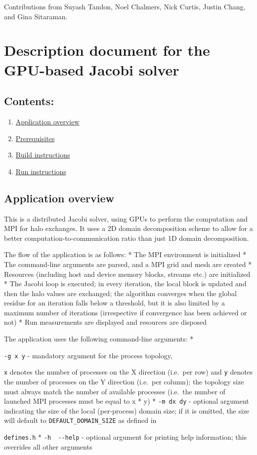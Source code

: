 \documentclass[
]{article}
\let\oldtexttt\texttt
\renewcommand{\texttt}[1]{
  \colorbox{Light}{\oldtexttt{#1}}
}
\begin{document}
Contributions from Suyash Tandon, Noel Chalmers, Nick Curtis, Justin
Chang, and Gina Sitaraman.

\hypertarget{description-document-for-the-gpu-based-jacobi-solver}{%
\section{Description document for the GPU-based Jacobi
solver}\label{description-document-for-the-gpu-based-jacobi-solver}}

\hypertarget{contents}{%
\subsection{Contents:}\label{contents}}

\begin{enumerate}
\def\labelenumi{\arabic{enumi}.}
\item
  \protect\hyperlink{application-overview}{Application overview}
\item
  \protect\hyperlink{prerequisites}{Prerequisites}
\item
  \protect\hyperlink{build-instructions}{Build instructions}
\item 
  \protect\hyperlink{run-instructions}{Run instructions}
\end{enumerate}

\subsection{Application overview}\label{application-overview}
This is a distributed Jacobi solver, using GPUs to perform the
computation and MPI for halo exchanges. It uses a 2D domain
decomposition scheme to allow for a better computation-to-communication
ratio than just 1D domain decomposition.

The flow of the application is as follows: * The MPI environment is
initialized * The command-line arguments are parsed, and a MPI grid and
mesh are created * Resources (including host and device memory blocks,
streams etc.) are initialized * The Jacobi loop is executed; in every
iteration, the local block is updated and then the halo values are
exchanged; the algorithm converges when the global residue for an
iteration falls below a threshold, but it is also limited by a maximum
number of iterations (irrespective if convergence has been achieved or
not) * Run measurements are displayed and resources are disposed

The application uses the following command-line arguments: *
\texttt{-g\ x\ y} - mandatory argument for the process topology,
\texttt{x} denotes the number of processes on the X direction (i.e.~per
row) and \texttt{y} denotes the number of processes on the Y direction
(i.e.~per column); the topology size must always match the number of
available processes (i.e.~the number of launched MPI processes must be
equal to x * y) * \texttt{-m\ dx\ dy} - optional argument indicating the
size of the local (per-process) domain size; if it is omitted, the size
will default to \texttt{DEFAULT\_DOMAIN\_SIZE} as defined in
\texttt{defines.h} * \texttt{-h\ \textbar{}\ -\/-help} - optional
argument for printing help information; this overrides all other
arguments
\end{document}
